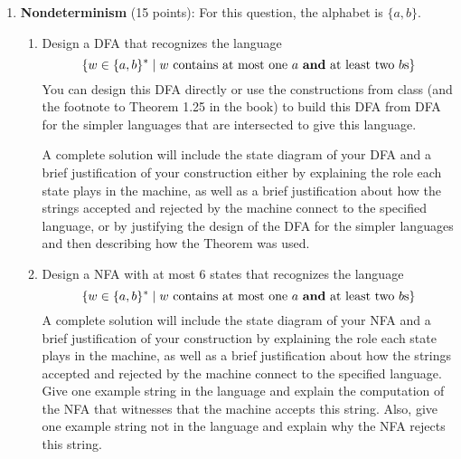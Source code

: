 \begin{enumerate}[wide, labelwidth=!, labelindent=0pt]
\begin{enumerate}
    {\it Hints}: (1) Consider having a state for each possible remainder upon division by $m$.
     (2) To determine transitions, notice that reading a new character will shift what we already read over by
     one slot.

    \item\gradeCorrectFirst Choose a positive integer $m_{0}$ between $5$ and $8$ (inclusive) and draw the state diagram
    of a DFA recognizing the following language over $\{0,1,2,3\}$ 
    $$\{ w \in \{0,1,2,3\}^* \mid w \text{ is a base $4$ expansion of a positive 
    integer that is a multiple of $m_0$}\}$$
    A complete solution will include the state diagram of your DFA and 
    a brief justification 
    of your construction by explaining the role each state plays in the machine, as well as a brief 
    justification about how the strings accepted and rejected by the machine connect to the specified language.
    \end{enumerate}

    {\it Bonus extension to think about (ungraded):} Which other languages related to sets of integers 
    can be proved to be regular using a similar strategy? 

\item \textbf{Nondeterminism} (15 points): For this question, the alphabet is $\{a,b\}$.
\begin{enumerate}
\item\gradeComplete Design a DFA that recognizes the language
    \[ 
    \{w \in \{a,b\}^* \mid w \text{ contains at most one $a$ {\bf and} at least two $b$s}\}
    \]
    You can design this DFA directly or use the constructions from class (and the footnote to Theorem 
    1.25 in the book) to build this DFA from DFA for the simpler languages that are intersected
    to give this language.
    
    A complete solution will include the state diagram of your DFA and 
    a brief justification 
    of your construction either by explaining the role each state plays in the machine, as well as a brief 
    justification about how the strings accepted and rejected by the machine connect to the specified language, 
    or by justifying the design of the DFA for the simpler languages and then describing how the Theorem was used.


    \item\gradeCorrect Design a NFA with at most $6$ states that recognizes the language
\[ 
\{w \in \{a,b\}^* \mid w \text{ contains at most one $a$ {\bf and} at least two $b$s}\}
\]
A complete solution will include the state diagram of your NFA and 
    a brief justification 
    of your construction by explaining the role each state plays in the machine, as well as a brief 
    justification about how the strings accepted and rejected by the machine connect to the specified language.
    Give one example string in the language and explain the computation of the NFA
    that witnesses that the machine accepts this string.
    Also, give one example string not in the language and explain why the NFA rejects this string.


\end{enumerate}
\end{enumerate}
